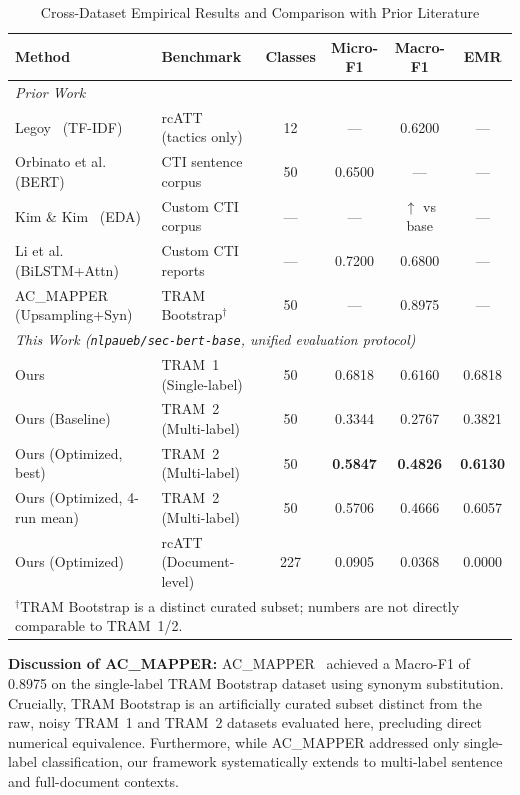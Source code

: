 \documentclass[runningheads]{llncs}
\begin{document}
\begin{table}[t]
\caption{Cross-Dataset Empirical Results and Comparison with Prior Literature}
\label{tab:all_results}
\setlength{\tabcolsep}{4.5pt}
\centering
\begin{tabular}{llcccc}
\toprule
Method & Benchmark & Classes & Micro-F1 & Macro-F1 & EMR \\
\midrule
\multicolumn{6}{l}{\textit{Prior Work}} \\
Legoy~\cite{legoy2020rcatt} (TF-IDF) & rcATT (tactics only) & 12 & --- & 0.6200 & --- \\
Orbinato et al.~\cite{orbinato2022automatic} (BERT) & CTI sentence corpus & 50 & 0.6500 & --- & --- \\
Kim \& Kim~\cite{kim2022ttp} (EDA) & Custom CTI corpus & --- & --- & $\uparrow$ vs base & --- \\
Li et al.~\cite{li2024automated} (BiLSTM+Attn) & Custom CTI reports & --- & 0.7200 & 0.6800 & --- \\
AC\_MAPPER~\cite{albarrak2025acmapper} (Upsampling+Syn) & TRAM Bootstrap$^\dagger$ & 50 & --- & 0.8975 & --- \\
\midrule
\multicolumn{6}{l}{\textit{This Work (\texttt{nlpaueb/sec-bert-base}, unified evaluation protocol)}} \\
Ours & TRAM~1 (Single-label) & 50 & 0.6818 & 0.6160 & 0.6818 \\
Ours (Baseline) & TRAM~2 (Multi-label) & 50 & 0.3344 & 0.2767 & 0.3821 \\
Ours (Optimized, best) & TRAM~2 (Multi-label) & 50 & \textbf{0.5847} & \textbf{0.4826} & \textbf{0.6130} \\
Ours (Optimized, 4-run mean) & TRAM~2 (Multi-label) & 50 & 0.5706 & 0.4666 & 0.6057 \\
Ours (Optimized) & rcATT (Document-level) & 227 & 0.0905 & 0.0368 & 0.0000 \\
\bottomrule
\multicolumn{6}{l}{\small $^\dagger$TRAM Bootstrap is a distinct curated subset; numbers are not directly comparable to TRAM~1/2.}
\end{tabular}
\end{table}

\textbf{Discussion of AC\_MAPPER:} AC\_MAPPER~\cite{albarrak2025acmapper} achieved a Macro-F1 of 0.8975 on the single-label TRAM Bootstrap dataset using synonym substitution. Crucially, TRAM Bootstrap is an artificially curated subset distinct from the raw, noisy TRAM~1 and TRAM~2 datasets evaluated here, precluding direct numerical equivalence. Furthermore, while AC\_MAPPER addressed only single-label classification, our framework systematically extends to multi-label sentence and full-document contexts.
\end{document}
